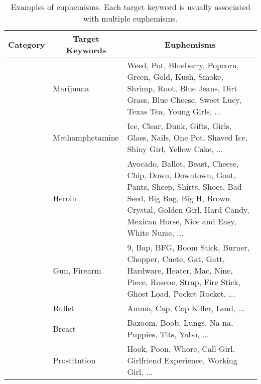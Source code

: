 \begin{table*}[t!]
	\centering
	\small
	\caption{Examples of euphemisms. Each target keyword is usually associated with multiple euphemisms.}
	\begin{tabular}{p{}p{}p{}}
		\toprule
		\multicolumn{1}{c}{\textbf{Category}} & \multicolumn{1}{c}{\textbf{Target Keywords}} &  \multicolumn{1}{c}{\textbf{Euphemisms}} \\
		\midrule
		\centering{Drug} & \centering Marijuana & Weed, Pot, Blueberry, Popcorn, Green, Gold, Kush, Smoke, Shrimp, Root, Blue Jeans, Dirt Grass, Blue Cheese, Sweet Lucy, Texas Tea, Young Girls, ... \\
		\midrule
		\centering{Drug} & \centering Methamphetamine & Ice, Clear, Dunk, Gifts, Girls, Glass, Nails, One Pot, Shaved Ice, Shiny Girl, Yellow Cake, ... \\
		\midrule
		\centering{Drug} & \centering Heroin & Avocado, Ballot, Beast, Cheese, Chip, Down, Downtown, Goat, Pants, Sheep, Shirts, Shoes, Bad Seed, Big Bag, Big H, Brown Crystal, Golden Girl,  Hard Candy, Mexican Horse, Nice and Easy, White Nurse, ... \\
		\midrule
		\centering{Weapon} & \centering Gun, Firearm & 9, Bap, BFG, Boom Stick, Burner, Chopper, Cuete, Gat, Gatt, Hardware, Heater, Mac, Nine, Piece, Roscoe, Strap, Fire Stick, Ghost Load, Pocket Rocket, ... \\
		\midrule
		\centering{Weapon} & \centering Bullet & Ammo, Cap, Cop Killer, Lead, ... \\
		\midrule
		\centering{Sexuality} & \centering Breast & Bazoom, Boob, Lungs, Na-na, Puppies, Tits, Yabo, ...\\
		\midrule
		\centering{Sexuality} & \centering Prostitution & Hook, Poon, Whore, Call Girl, Girlfriend Experience, Working Girl, ... \\
		\bottomrule
	\end{tabular}
	\label{table:example2}
	\vspace{+0.2cm}
\end{table*}



